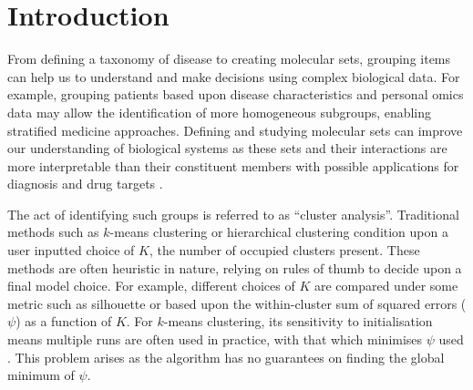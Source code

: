 \documentclass{bioinfo}
\begin{document}
\maketitle

\section{Introduction}

From defining a taxonomy of disease to creating molecular sets, grouping items can help us to understand and make decisions using complex biological data. For example, grouping patients based upon disease characteristics and personal omics data may allow the identification of more homogeneous subgroups, enabling stratified medicine approaches. Defining and studying molecular sets can improve our understanding of biological systems as these sets and their interactions are more interpretable than their constituent members \citep{hejblum2015time} with possible applications for diagnosis and drug targets \citep{bai2013strategic, emmert2014gene}. 




The act of identifying such groups is referred to as “cluster analysis”. Traditional methods such as $k$-means clustering \citep{lloyd1982least, forgy1965cluster} or hierarchical clustering condition upon a user inputted choice of $K$, the number of occupied clusters present.  These methods are often heuristic in nature, relying on rules of thumb to decide upon a final model choice. For example, different choices of $K$ are compared under some metric such as silhouette or based upon the within-cluster sum of squared errors ($\psi$) as a function of $K$. For $k$-means clustering, its sensitivity to initialisation means multiple runs are often used in practice, with that which minimises $\psi$ used \citep{arthur2006k}. This problem arises as the algorithm has no guarantees on finding the global minimum of $\psi$.
\end{document}
